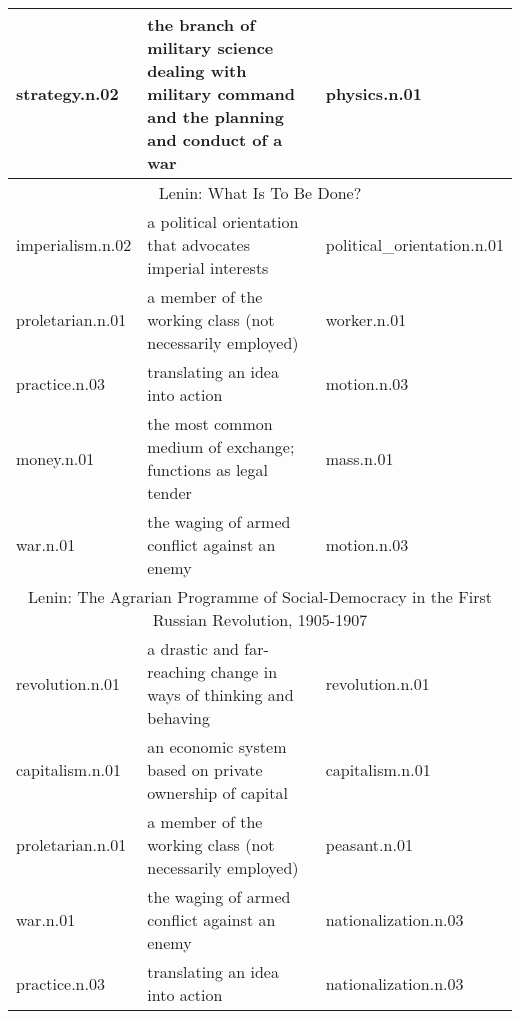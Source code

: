 \begin{table*}[ht]
\begin{tabular}{ p{2.5cm} p{9cm} p{2.5cm}}
    strategy.n.02 & the branch of military science dealing with military command and the planning and conduct of a war & physics.n.01\\
    \midrule  \multicolumn{3}{c}{Lenin: What Is To Be Done?} \\  \midrule
    imperialism.n.02 & a political orientation that advocates imperial interests & political\_orientation.n.01\\
    proletarian.n.01 & a member of the working class (not necessarily employed) & worker.n.01\\
    practice.n.03 & translating an idea into action & motion.n.03\\
    money.n.01 & the most common medium of exchange; functions as legal tender & mass.n.01\\
    war.n.01 & the waging of armed conflict against an enemy & motion.n.03\\

    \midrule  \multicolumn{3}{c}{Lenin: The Agrarian Programme of Social-Democracy in the First Russian Revolution, 1905-1907} \\  \midrule
    revolution.n.01 & a drastic and far-reaching change in ways of thinking and behaving & revolution.n.01\\
    capitalism.n.01 & an economic system based on private ownership of capital & capitalism.n.01\\
    proletarian.n.01 & a member of the working class (not necessarily employed) & peasant.n.01\\
    war.n.01 & the waging of armed conflict against an enemy & nationalization.n.03\\
    practice.n.03 & translating an idea into action & nationalization.n.03\\

    \bottomrule
\end{tabular}
\end{table*}
